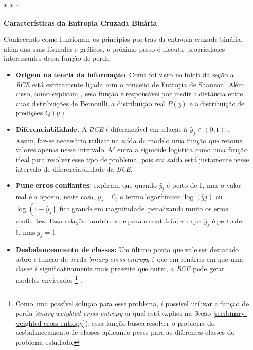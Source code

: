 \medskip
\begin{center}
 * * *
\end{center}
\medskip

\textbf{Características da Entropia Cruzada Binária}
\vspace{1em}

Conhecendo como funcionam os princípios por trás da entropia-cruzada binária, além das suas fórmulas e gráficos, o próximo passo é discutir propriedades interessantes dessa função de perda. 

\begin{itemize}
    \item \textbf{Origem na teoria da informação:} Como foi visto no início da seção a \textit{BCE} está estritamente ligada com o conceito de Entropia de Shannon. Além disso, como explicam \textcite{LossesArticle}, essa função é responsável por medir a distância entre duas distribuições de Bernoulli, a distribuição real $P(y)$ e a distribuição de predições $Q(y)$.
    \item \textbf{Diferenciabilidade:} A \textit{BCE} é diferenciável em relação à $\hat{y}_j \in (0,1)$ \parencite{LossesArticle}. Assim, faz-se necessário utilizar na saída do modelo uma função que retorne valores apenas nesse intervalo. Aí entra a sigmoide logística como uma função ideal para resolver esse tipo de problema, pois sua saída está justamente nesse intervalo de diferenciabilidade da \textit{BCE}. 
    \item \textbf{Pune erros confiantes:} \textcite{LossesArticle} explicam que quando $\hat{y}_j$ é perto de 1, mas o valor real é o oposto, neste caso, $y_j = 0$, o termo logarítimico $\log(\hat{y}j)$ ou $\log(1 - \hat{y}_j)$ fica grande em magnitudade, penalizando muito os erros confiantes. Essa relação também vale para o contrário, em que $\hat{y}_j$ é perto de 0, mas $y_j = 1$.
    \item \textbf{Desbalanceamento de classes:} Um último ponto que vale ser destacado sobre a função de perda \textit{binary cross-entropy} é que em cenários em que uma classe é significativamente mais presente que outra, a \textit{BCE} pode gerar modelos enviesados \footnote{Como uma possível solução para esse problema, é possível utilizar a função de perda \textit{binary weighted cross-entropy} (a qual está explica na Seção \ref{sec:binary-weighted-cross-entropy}), essa função busca resolver o problema do desbalanceamento de classes aplicando pesos para as diferentes classes do problema estudado.} \parencite{LossesArticle}.
\end{itemize}

